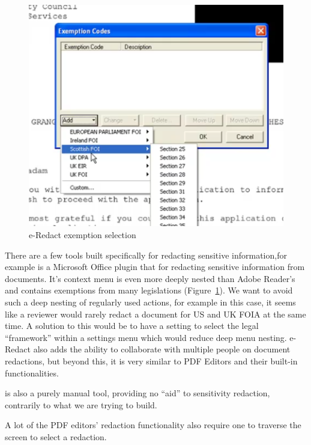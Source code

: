 \documentclass[\version]{l4proj}
\begin{document}
\begin{figure}
    \includegraphics[width=\linewidth]{images/related_products/eredact_dropdown.png}
    \caption{e-Redact exemption selection}\label{fig:eredact-dropdown}
    \vspace{-17pt}
\end{figure}

There are a few tools built specifically for redacting sensitive information,for example \textcite{ERedact} is a Microsoft Office plugin that for redacting sensitive information from documents.
It's context menu is even more deeply nested than Adobe Reader's and contains exemptions from many legislations (Figure~\ref{fig:eredact-dropdown}).
We want to avoid such a deep nesting of regularly used actions, for example in this case, it seems like a reviewer would rarely redact a document for US and UK FOIA at the same time.
A solution to this would be to have a setting to select the legal ``framework'' within a settings menu which would reduce deep menu nesting.
e-Redact also adds the ability to collaborate with multiple people on document redactions, but beyond this, it is very similar to PDF Editors and their built-in functionalities.

\textcite{ERedact} is also a purely manual tool, providing no ``aid'' to sensitivity redaction, contrarily to what we are trying to build.

A lot of the PDF editors' redaction functionality also require one to traverse the screen to select a redaction.
\end{document}
